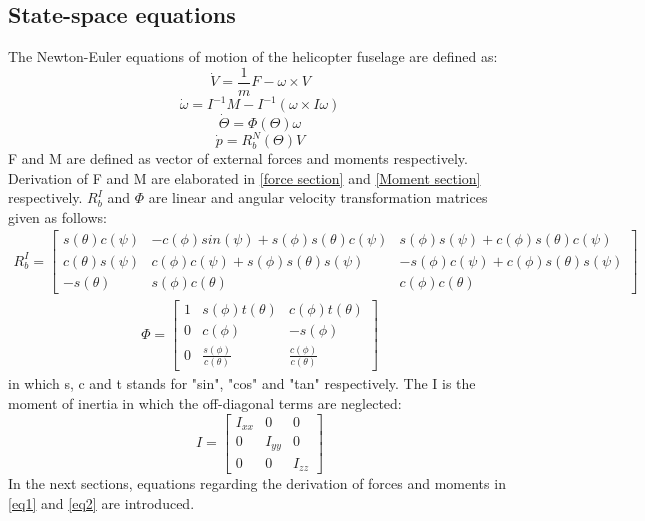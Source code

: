 \subsection{State-space equations}
The Newton-Euler equations of motion of the helicopter fuselage are defined as:
\begin{equation}\label{eq1}
	\dot{V}=\frac{1}{m} F-\omega\times V
\end{equation}
\begin{equation}\label{eq2}
	\dot{\omega}=I^{-1}M-I^{-1}(\omega \times I \omega) 
\end{equation}
\begin{equation}
	\dot{\Theta}=\Phi(\Theta)\omega 
\end{equation}
\begin{equation}
	\dot{p}=R_{b}^N(\Theta)V
\end{equation}
F and M are defined as vector of external forces and moments respectively. Derivation of F and M are elaborated in \ref{force section} and \ref{Moment section} respectively. $R_b^I$ and $\Phi$ are linear and angular velocity transformation matrices given as follows: 
\begin{gather}
	R_b^I
	=
	\begin{bmatrix}
		s(\theta)c(\psi) &
		-c(\phi)sin(\psi)+s(\phi)s(\theta)c(\psi)&
		s(\phi)s(\psi)+c(\phi)s(\theta)c(\psi) \\
		c(\theta)s(\psi) &
		c(\phi)c(\psi)+s(\phi)s(\theta)s(\psi)&
		-s(\phi)c(\psi)+c(\phi)s(\theta)s(\psi)\\
		-s(\theta)&
		s(\phi)c(\theta)&
		c(\phi)c(\theta)
	\end{bmatrix}
\end{gather}
\begin{gather}
	\Phi
	=
	\begin{bmatrix}
		1 &
		s(\phi)t(\theta)&
		c(\phi)t(\theta) \\
		0 &
		c(\phi)&
		-s(\phi)\\
		0&
		\frac{s(\phi)}{c(\theta)} &
		\frac{c(\phi)}{c(\theta)}
	\end{bmatrix}
\end{gather}
in which s, c and t stands for "sin", "cos" and "tan" respectively.
The I is the moment of inertia in which the off-diagonal terms are neglected:
\begin{equation}
	I=
	\begin{bmatrix}
		I_{xx} &
		0&
		0 \\
		0 &
		I_{yy}&
		0\\
		0&
		0&
		I_{zz}
	\end{bmatrix}
\end{equation}
In the next sections, equations regarding the derivation of forces and moments in \ref{eq1} and \ref{eq2} are introduced.
